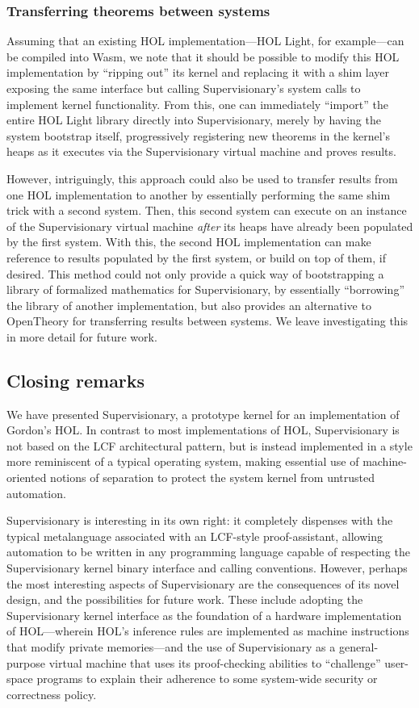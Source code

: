 \documentclass[a4paper, UKenglish, cleveref, autoref, thm-restate, colorlinks]{lipics-v2021}
\begin{document}
\subsubsection*{Transferring theorems between systems}

Assuming that an existing HOL implementation---HOL Light, for example---can be compiled into Wasm, we note that it should be possible to modify this HOL implementation by ``ripping out'' its kernel and replacing it with a shim layer exposing the same interface but calling Supervisionary's system calls to implement kernel functionality.
From this, one can immediately ``import'' the entire HOL Light library directly into Supervisionary, merely by having the system bootstrap itself, progressively registering new theorems in the kernel's heaps as it executes via the Supervisionary virtual machine and proves results.

However, intriguingly, this approach could also be used to transfer results from one HOL implementation to another by essentially performing the same shim trick with a second system.
Then, this second system can execute on an instance of the Supervisionary virtual machine \emph{after} its heaps have already been populated by the first system.
With this, the second HOL implementation can make reference to results populated by the first system, or build on top of them, if desired.
This method could not only provide a quick way of bootstrapping a library of formalized mathematics for Supervisionary, by essentially ``borrowing'' the library of another implementation, but also provides an alternative to OpenTheory for transferring results between systems.
We leave investigating this in more detail for future work.

\subsection{Closing remarks}

We have presented Supervisionary, a prototype kernel for an implementation of Gordon's HOL.
In contrast to most implementations of HOL, Supervisionary is not based on the LCF architectural pattern, but is instead implemented in a style more reminiscent of a typical operating system, making essential use of machine-oriented notions of separation to protect the system kernel from untrusted automation.

Supervisionary is interesting in its own right: it completely dispenses with the typical metalanguage associated with an LCF-style proof-assistant, allowing automation to be written in any programming language capable of respecting the Supervisionary kernel binary interface and calling conventions.
However, perhaps the most interesting aspects of Supervisionary are the consequences of its novel design, and the possibilities for future work.
These include adopting the Supervisionary kernel interface as the foundation of a hardware implementation of HOL---wherein HOL's inference rules are implemented as machine instructions that modify private memories---and the use of Supervisionary as a general-purpose virtual machine that uses its proof-checking abilities to ``challenge'' user-space programs to explain their adherence to some system-wide security or correctness policy.
\end{document}
